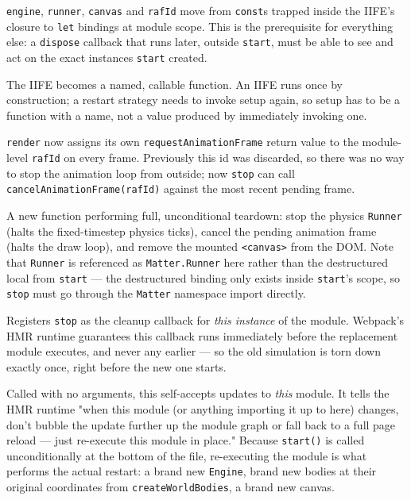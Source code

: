 \documentclass{article}
\begin{document}
\begin{description}[leftmargin=1.6cm, style=nextline]
  \item[Module-level state] \texttt{engine}, \texttt{runner}, \texttt{canvas}
    and \texttt{rafId} move from \texttt{const}s trapped inside the IIFE's
    closure to \texttt{let} bindings at module scope. This is the
    prerequisite for everything else: a \texttt{dispose} callback that runs
    later, outside \texttt{start}, must be able to see and act on the exact
    instances \texttt{start} created.
  \item[\texttt{main} $\rightarrow$ \texttt{start}] The IIFE becomes a named,
    callable function. An IIFE runs once by construction; a restart strategy
    needs to invoke setup again, so setup has to be a function with a name,
    not a value produced by immediately invoking one.
  \item[\texttt{rafId} capture] \texttt{render} now assigns its own
    \texttt{requestAnimationFrame} return value to the module-level
    \texttt{rafId} on every frame. Previously this id was discarded, so
    there was no way to stop the animation loop from outside; now
    \texttt{stop} can call \texttt{cancelAnimationFrame(rafId)} against the
    most recent pending frame.
  \item[\texttt{stop}] A new function performing full, unconditional
    teardown: stop the physics \texttt{Runner} (halts the fixed-timestep
    physics ticks), cancel the pending animation frame (halts the draw
    loop), and remove the mounted \texttt{<canvas>} from the DOM. Note that
    \texttt{Runner} is referenced as \texttt{Matter.Runner} here rather than
    the destructured local from \texttt{start} --- the destructured binding
    only exists inside \texttt{start}'s scope, so \texttt{stop} must go
    through the \texttt{Matter} namespace import directly.
  \item[\texttt{module.hot.dispose(stop)}] Registers \texttt{stop} as the
    cleanup callback for \emph{this instance} of the module. Webpack's HMR
    runtime guarantees this callback runs immediately before the replacement
    module executes, and never any earlier --- so the old simulation is torn
    down exactly once, right before the new one starts.
  \item[\texttt{module.hot.accept()}] Called with no arguments, this
    self-accepts updates to \emph{this} module. It tells the HMR runtime
    "when this module (or anything importing it up to here) changes, don't
    bubble the update further up the module graph or fall back to a full
    page reload --- just re-execute this module in place." Because
    \texttt{start()} is called unconditionally at the bottom of the file,
    re-executing the module is what performs the actual restart: a brand
    new \texttt{Engine}, brand new bodies at their original coordinates from
    \texttt{createWorldBodies}, a brand new canvas.
\end{description}
\end{document}
